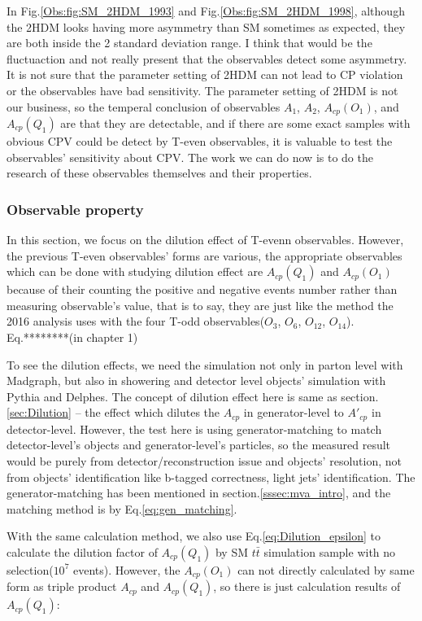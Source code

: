 			In Fig.\ref{Obs:fig:SM_2HDM_1993} and Fig.\ref{Obs:fig:SM_2HDM_1998}, although the 2HDM looks having more asymmetry than SM sometimes as expected, they are both inside the 2 standard deviation range. I think that would be the fluctuaction and not really present that the observables detect some asymmetry. It is not sure that the parameter setting of 2HDM can not lead to CP violation or the observables have bad sensitivity. The parameter setting of 2HDM is not our business, so the temperal conclusion of observables $A_1$, $A_2$, $A_{cp}(O_1)$, and $A_{cp}(Q_1)$ are that they are detectable, and if there are some exact samples with obvious CPV could be detect by T-even observables, it is valuable to test the observables' sensitivity about CPV. The work we can do now is to do the research of these observables themselves and their properties.

		\subsubsection{Observable property}
		\label{sssec:AcpObs_property}

			In this section, we focus on the dilution effect of T-evenn observables. However, the previous T-even observables' forms are various, the appropriate observables which can be done with studying dilution effect are $A_{cp}(Q_1)$ and $A_{cp}(O_1)$ because of their counting the positive and negative events number rather than measuring observable's value, that is to say, they are just like the method the 2016 analysis uses with the four T-odd observables($O_3$, $O_6$, $O_{12}$, $O_{14}$). Eq.********(in chapter 1)

			To see the dilution effects, we need the simulation not only in parton level with Madgraph, but also in showering and detector level objects' simulation with Pythia and Delphes. The concept of dilution effect here is same as section.\ref{sec:Dilution} -- the effect which dilutes the $A_{cp}$ in generator-level to $A'_{cp}$ in detector-level. However, the test here is using generator-matching to match detector-level's objects and generator-level's particles, so the measured result would be purely from detector/reconstruction issue and objects' resolution, not from objects' identification like b-tagged correctness, light jets' identification. The generator-matching has been mentioned in section.\ref{sssec:mva_intro}, and the matching method is by Eq.\ref{eq:gen_matching}.

			With the same calculation method, we also use Eq.\ref{eq:Dilution_epsilon} to calculate the dilution factor of $A_{cp}(Q_1)$ by SM $t\bar{t}$ simulation sample with no selection($10^7$ events). However, the $A_{cp}(O_1)$ can not directly calculated by same form as triple product $A_{cp}$ and $A_{cp}(Q_1)$, so there is just calculation results of $A_{cp}(Q_1)$:

